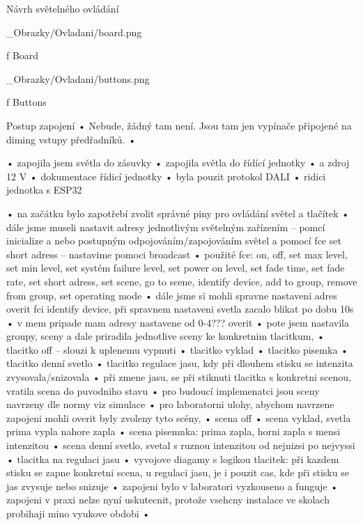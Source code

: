 \chap Návrh světelného ovládání

\medskip {}
\picw=10cm _Obrazky/Ovladani/board.png
\caption/f Board
\medskip

\medskip {}
\picw=15cm _Obrazky/Ovladani/buttons.png
\caption/f Buttons
\medskip





Postup zapojení
    • Nebude, žádný tam není. Jsou tam jen vypínače připojené na diming vstupy předřadníků.
    • 

    • zapojila jsem světla do zásuvky
    • zapojila světla do řídící jednotky
    • a zdroj 12 V
    • dokumentace řídicí jednotky
    • byla pouzit protokol DALI
    • ridici jednotka s ESP32

    • na začátku bylo zapotřebí zvolit správné piny pro ovládání světel a tlačítek
    • dále jsme museli nastavit adresy jednotlivým světelným zařízením – pomcí inicialize a nebo postupným odpojováním/zapojováním světel a pomocí fce set short adress – nastavime pomoci broadcast
    • použité fce: on, off, set max level, set min level, set systém failure level, set power on level, set fade time, set fade rate, set short adress, set scene, go to scene, identify device, add to group, remove from group, set operating mode
    • dále jsme si mohli spravne nastaveni adres overit fci identify device, při spravnem nastaveni svetla zacalo blikat po dobu 10s
    • v mem pripade mam adresy nastavene od 0-4??? overit
    • pote jsem nastavila groupy, sceny a dale priradila jednotlive sceny ke konkretnim tlacitkum,
    • tlacitko off – slouzi k uplenemu vypnuti
    • tlacitko vyklad
    • tlacitko pisemka
    • tlacitko denní svetlo
    • tlacitko regulace jasu, kdy při dlouhem stisku se intenzita zvysovala/snizovala
    • při zmene jasu, se při stiknuti tlacitka s konkretni scenou, vratila scena do puvodniho stavu
    • pro budoucí implemenatci jsou sceny navrzeny dle normy viz simulace
    • pro laboratorni ulohy, abychom navrzene zapojeni mohli overit byly zvoleny tyto scény,
    • scena off
    • scena vyklad, svetla prima vypla nahore zapla
    • scena pisemnka: prima zapla, horni zapla s mensi intenzitou
    • scena denní svetlo, svetal s ruznou intenzitou od nejnizsi po nejvyssi
    • tlacitka na regulaci jasu
    • vyvojove diagamy s logikou tlacitek: při kazdem stisku se zapne konkretni scena, u regulaci jasu, je i pouzit cas, kde při stisku se jas zvysuje nebo snizuje
    • zapojeni bylo v laboratori vyzkouseno a funguje
    • zapojeni v praxi nelze nyní uskutecnit, protože vsehcny instalace ve skolach probihaji mino vyukove obdobi
    • 


